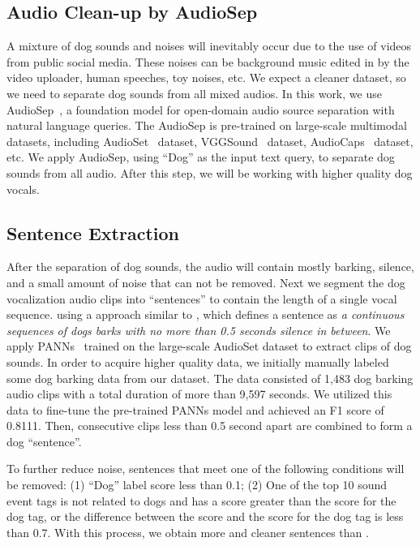 \subsection{Audio Clean-up by AudioSep}

A mixture of dog sounds and noises will inevitably occur due to the use of videos from 
public social media. These noises can be background music edited in by the video uploader, 
human speeches, toy noises, etc. 
We expect a cleaner dataset, so we need to separate dog sounds from all mixed audios. 
In this work, we use AudioSep~\citep{liu2023separate}, a foundation model for open-domain audio source separation with natural language queries. The AudioSep is pre-trained on large-scale multimodal datasets, including AudioSet~\citep{gemmeke2017audio} dataset, VGGSound~\citep{chen2020vggsound} dataset, AudioCaps~\citep{kim2019audiocaps} dataset, etc. 
We apply AudioSep, using ``Dog'' as the input text query, to separate dog sounds from all audio. 
After this step, we will be working with higher quality dog vocals. 


\subsection{Sentence Extraction}
After the separation of dog sounds, the audio will contain mostly barking, silence, and 
a small amount of noise that can not be removed. 
Next we segment the dog vocalization audio clips into ``sentences'' to contain the length
of a single vocal sequence.
using a approach similar to \citet{huang2023transcribing}, 
which defines a sentence as \textit{a continuous sequences of dogs barks with no more than 
0.5 seconds silence in between}.
We apply PANNs~\cite{kong2020panns} trained on the large-scale AudioSet dataset to 
extract clips of dog sounds. In order to acquire higher quality data, we initially manually 
labeled some dog barking data from our dataset. 
The data consisted of 1,483 dog barking audio clips with a total duration of more 
than 9,597 seconds. We utilized this data to fine-tune the pre-trained PANNs model 
and achieved an F1 score of 0.8111. Then, consecutive clips less than 0.5 second apart 
are combined to form a dog ``sentence''. 

To further reduce noise, sentences that meet one of the following conditions will be removed: 
(1) ``Dog'' label score less than 0.1; 
(2) One of the top 10 sound event tags is not related to dogs and has a score greater 
than the score for the dog tag, or the 
difference between the score and the score for the dog tag is less than 0.7. 
With this process, we obtain more and cleaner sentences 
than \citet{huang2023transcribing}.

